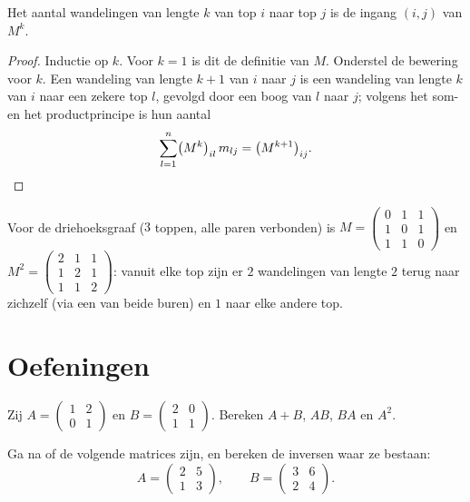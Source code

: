 \begin{theorem}\label{thm:g12:matrix:walks}
Het aantal wandelingen van lengte $k$ van top $i$ naar top $j$ is de ingang
$(i,j)$ van $M^k$.
\end{theorem}

\begin{proof}
Inductie op $k$. Voor $k = 1$ is dit de definitie van $M$. Onderstel de
bewering voor $k$. Een wandeling van lengte $k+1$ van $i$ naar $j$ is een
wandeling van lengte $k$ van $i$ naar een zekere top $l$, gevolgd door een
boog van $l$ naar $j$; volgens het som- en het productprincipe is hun aantal
\[
\sum_{l=1}^{n} \bigl(M^k\bigr)_{il}\, m_{lj} = \bigl(M^{k+1}\bigr)_{ij}.
\qedhere
\]
\end{proof}

\begin{example}
Voor de driehoeksgraaf ($3$ toppen, alle paren verbonden) is
$M = \begin{pmatrix} 0&1&1\\ 1&0&1\\ 1&1&0\end{pmatrix}$ en
$M^2 = \begin{pmatrix} 2&1&1\\ 1&2&1\\ 1&1&2\end{pmatrix}$: vanuit elke top
zijn er $2$ wandelingen van lengte $2$ terug naar zichzelf (via een van beide
buren) en $1$ naar elke andere top.
\end{example}

\section{Oefeningen}

\begin{exercise}[$\star$]\label{exo:g12:matrix:1}
Zij $A = \begin{pmatrix} 1 & 2\\ 0 & 1 \end{pmatrix}$ en
$B = \begin{pmatrix} 2 & 0\\ 1 & 1 \end{pmatrix}$. Bereken $A + B$, $AB$,
$BA$ en $A^2$.
\end{exercise}

\begin{exercise}[$\star$]\label{exo:g12:matrix:2}
Ga na of de volgende matrices  zijn, en bereken de inversen waar
ze bestaan:
\[
A = \begin{pmatrix} 2 & 5\\ 1 & 3\end{pmatrix}, \qquad
B = \begin{pmatrix} 3 & 6\\ 2 & 4\end{pmatrix}.
\]
\end{exercise}

